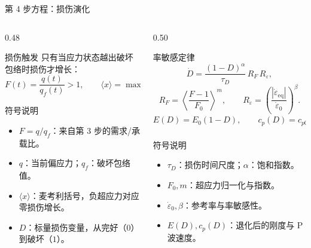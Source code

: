 \documentclass[11pt,aspectratio=169]{beamer}
\begin{document}
\begin{frame}{第 4 步方程：损伤演化}
  \scriptsize
  \begin{columns}[T,onlytextwidth]
    \begin{column}{0.48\textwidth}
      \begin{alertblock}{损伤触发}
        只有当应力状态越出破坏包络时损伤才增长：
        \[
          F(t)=\frac{q(t)}{q_f(t)}>1,\qquad
          \langle x\rangle=\max(x,0).
        \]
      \end{alertblock}
      \begin{block}{符号说明}
        \begin{itemize}
          \item $F=q/q_f$：来自第 3 步的需求/承载比。
          \item $q$：当前偏应力；$q_f$：破坏包络值。
          \item $\langle x\rangle$：麦考利括号，负超应力对应零损伤增长。
          \item $D$：标量损伤变量，从完好（$0$）到破坏（$1$）。
        \end{itemize}
      \end{block}
    \end{column}
    \begin{column}{0.50\textwidth}
      \begin{exampleblock}{率敏感定律}
        \[
          \dot{D}=\frac{(1-D)^\alpha}{\tau_D}
          \,R_F\,R_{\dot{\varepsilon}},
        \]
        \[
          R_F=\left\langle\frac{F-1}{F_0}\right\rangle^m,
          \qquad
          R_{\dot{\varepsilon}}=
          \left(\frac{|\dot{\varepsilon}_{\mathrm{eq}}|}
          {\dot{\varepsilon}_0}\right)^\beta .
        \]
        \[
          E(D)=E_0(1-D),\qquad
          c_p(D)=c_{p0}\sqrt{\max(1-D,0)}.
        \]
      \end{exampleblock}
      \begin{block}{符号说明}
        \begin{itemize}
          \item $\tau_D$：损伤时间尺度；$\alpha$：饱和指数。
          \item $F_0,m$：超应力归一化与指数。
          \item $\dot{\varepsilon}_0,\beta$：参考率与率敏感性。
          \item $E(D),c_p(D)$：退化后的刚度与 P 波速度。
        \end{itemize}
      \end{block}
    \end{column}
  \end{columns}
\end{frame}
\end{document}
